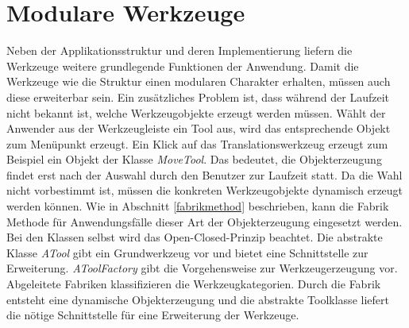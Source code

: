 \section{Modulare Werkzeuge}
Neben der Applikationsstruktur und deren Implementierung liefern die Werkzeuge weitere grundlegende Funktionen der Anwendung. Damit die Werkzeuge wie die Struktur einen modularen Charakter erhalten, müssen auch diese erweiterbar sein. Ein zusätzliches Problem ist, dass während der Laufzeit nicht bekannt ist, welche Werkzeugobjekte erzeugt werden müssen. Wählt der Anwender aus der Werkzeugleiste ein Tool aus, wird das entsprechende Objekt zum Menüpunkt erzeugt. Ein Klick auf das Translationswerkzeug erzeugt zum Beispiel ein Objekt der Klasse \textit{MoveTool}. Das bedeutet, die Objekterzeugung findet erst nach der Auswahl durch den Benutzer zur Laufzeit statt. Da die Wahl nicht vorbestimmt ist, müssen die konkreten Werkzeugobjekte dynamisch erzeugt werden können. Wie in Abschnitt \ref{fabrikmethod} beschrieben, kann die Fabrik Methode für Anwendungsfälle dieser Art der Objekterzeugung eingesetzt werden. Bei den Klassen selbst wird das Open-Closed-Prinzip beachtet. Die abstrakte Klasse \textit{ATool} gibt ein Grundwerkzeug vor und bietet eine Schnittstelle zur Erweiterung. \textit{AToolFactory} gibt die Vorgehensweise zur Werkzeugerzeugung vor. Abgeleitete Fabriken klassifizieren die Werkzeugkategorien. Durch die Fabrik entsteht eine dynamische Objekterzeugung und die abstrakte Toolklasse liefert die nötige Schnittstelle für eine Erweiterung der Werkzeuge.


